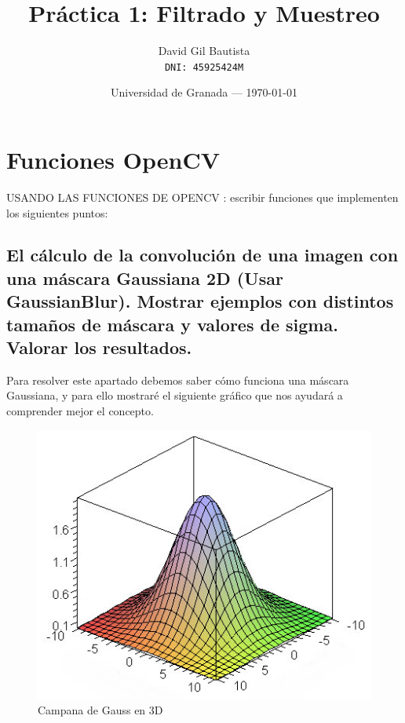 \documentclass{article}
\title{Práctica 1: Filtrado y Muestreo} %
\author{David Gil Bautista\\ \texttt{DNI: 45925424M}} %
\date{Universidad de Granada --- \today} %
\begin{document}
\maketitle %


\section{Funciones OpenCV} %

USANDO LAS FUNCIONES DE OPENCV : escribir funciones que implementen los siguientes puntos:

\subsection{El cálculo de la convolución de una imagen con una máscara Gaussiana 2D (Usar GaussianBlur). Mostrar ejemplos con distintos tamaños de máscara y valores de sigma. Valorar los resultados.}

Para resolver este apartado debemos saber cómo funciona una máscara Gaussiana, y para ello mostraré el siguiente gráfico que nos ayudará a comprender mejor el concepto.

\begin{figure}[h]

\centering
\includegraphics{gauss.PNG}
\caption{Campana de Gauss en 3D}
\label{fig:gauss}

\end{figure}
\end{document}
